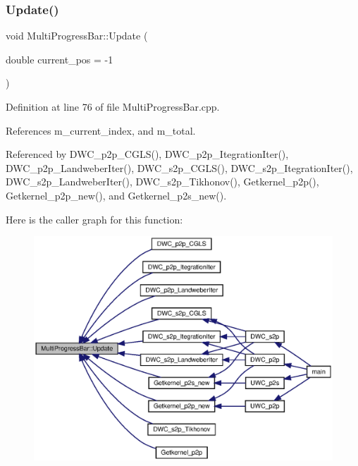 \subsubsection{Update()\hspace{0.1cm}{\footnotesize\ttfamily [1/2]}}
{\footnotesize\ttfamily void Multi\+Progress\+Bar\+::\+Update (\begin{DoxyParamCaption}\item[{double}]{current\+\_\+pos = {\ttfamily -\/1} }\end{DoxyParamCaption})}



Definition at line 76 of file Multi\+Progress\+Bar.\+cpp.



References m\+\_\+current\+\_\+index, and m\+\_\+total.



Referenced by D\+W\+C\+\_\+p2p\+\_\+\+C\+G\+L\+S(), D\+W\+C\+\_\+p2p\+\_\+\+Itegration\+Iter(), D\+W\+C\+\_\+p2p\+\_\+\+Landweber\+Iter(), D\+W\+C\+\_\+s2p\+\_\+\+C\+G\+L\+S(), D\+W\+C\+\_\+s2p\+\_\+\+Itegration\+Iter(), D\+W\+C\+\_\+s2p\+\_\+\+Landweber\+Iter(), D\+W\+C\+\_\+s2p\+\_\+\+Tikhonov(), Getkernel\+\_\+p2p(), Getkernel\+\_\+p2p\+\_\+new(), and Getkernel\+\_\+p2s\+\_\+new().

Here is the caller graph for this function\+:
\nopagebreak
\begin{figure}[H]
\begin{center}
\leavevmode
\includegraphics[width=350pt]{classMultiProgressBar_a58eef55ad6d5c7d769b3a402a2ef7b85_a58eef55ad6d5c7d769b3a402a2ef7b85_icgraph}
\end{center}
\end{figure}
\mbox{\label{classMultiProgressBar_abf5be627ae86f33f482125ce2e4370c7_abf5be627ae86f33f482125ce2e4370c7}} 
